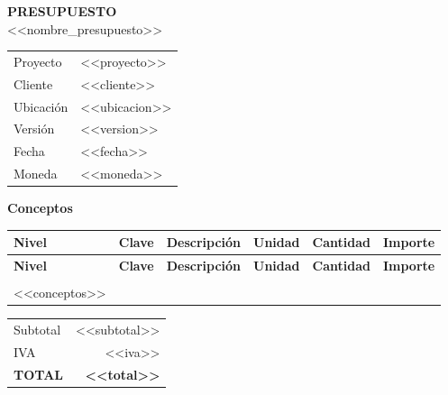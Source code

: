 \documentclass[11pt,a4paper]{article}
\begin{document}
\begin{center}
  {\Huge\color{Principal}\textbf{PRESUPUESTO}}\\[2mm]
  {\Large <<nombre_presupuesto>>}
\end{center}

\vspace{5mm}

\begin{tabularx}{\textwidth}{@{} l X @{}}
  Proyecto    & <<proyecto>>\\
  Cliente     & <<cliente>>\\
  Ubicaci\'on & <<ubicacion>>\\
  Versi\'on   & <<version>>\\
  Fecha       & <<fecha>>\\
  Moneda      & <<moneda>>\\
\end{tabularx}

\vspace{8mm}

{\Large\textbf{Conceptos}}

\renewcommand{\arraystretch}{1.2}
\begin{longtable}{@{}>{\centering\arraybackslash}p{1cm} >{\centering\arraybackslash}p{2cm} p{6.6cm} >{\centering\arraybackslash}p{1.2cm} >{\raggedleft\arraybackslash}p{2cm} >{\raggedleft\arraybackslash}p{2.2cm}@{}}
  \toprule
  \rowcolor{Gris2}
  \textbf{Nivel} & \textbf{Clave} & \textbf{Descripci\'on} &
  \textbf{Unidad} & \textbf{Cantidad} & \textbf{Importe}\\
  \midrule
  \endfirsthead

  \toprule
  \rowcolor{Gris2}
  \textbf{Nivel} & \textbf{Clave} & \textbf{Descripci\'on} &
  \textbf{Unidad} & \textbf{Cantidad} & \textbf{Importe}\\
  \midrule
  \endhead

  \midrule
  \multicolumn{6}{r}{\textit{Contin\'ua...}}\\
  \endfoot

  \bottomrule
  \endlastfoot

<<conceptos>>

\end{longtable}

\vspace{4mm}
\begin{flushright}
  \begin{tabular}{@{} l r @{}}
    \toprule
    Subtotal       & <<subtotal>>\\
    IVA            & <<iva>>\\
    \midrule
    \textbf{TOTAL} & \textbf{<<total>>}\\
    \bottomrule
  \end{tabular}
\end{flushright}
\end{document}
